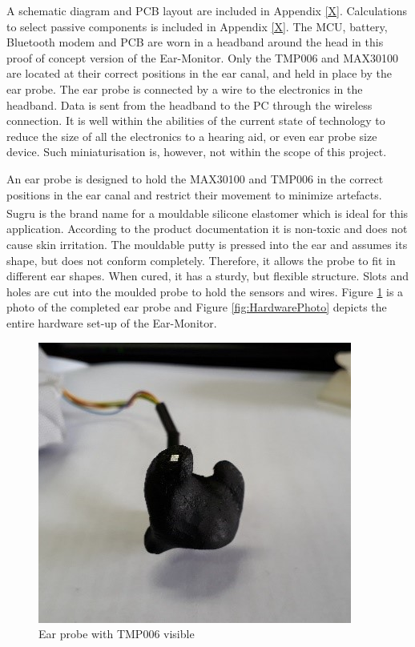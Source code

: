 A schematic diagram and PCB layout are included in Appendix \ref{X}. Calculations to select passive components is included in Appendix \ref{X}. The MCU, battery, Bluetooth modem and PCB are worn in a headband around the head in this proof of concept version of the Ear-Monitor. Only the TMP006 and MAX30100 are located at their correct positions in the ear canal, and held in place by the ear probe. The ear probe is connected by a wire to the electronics in the headband. Data is sent from the headband to the PC through the wireless connection. It is well within the abilities of the current state of technology to reduce the size of all the electronics to a hearing aid, or even ear probe size device. Such miniaturisation is, however, not within the scope of this project.

\medskip

An ear probe is designed to hold the MAX30100 and TMP006 in the correct positions in the ear canal and restrict their movement to minimize artefacts. Sugru\textsuperscript{\textregistered} is the brand name for a mouldable silicone elastomer which is ideal for this application. According to the product documentation it is non-toxic and does not cause skin irritation. The mouldable putty is pressed into the ear and assumes its shape, but does not conform completely. Therefore, it allows the probe to fit in different ear shapes. When cured, it has a sturdy, but flexible structure. Slots and holes are cut into the moulded probe to hold the sensors and wires. Figure \ref{fig:EarProbe} is a photo of the completed ear probe and Figure \ref{fig:HardwarePhoto} depicts the entire hardware set-up of the Ear-Monitor.

\begin{figure}[H]
   \centering
   \includegraphics[scale=1]{figs/EarProbe.jpg}
   \caption{Ear probe with TMP006 visible}
   \label{fig:EarProbe}
\end{figure}

